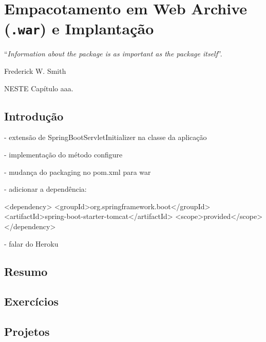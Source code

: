 \chapter{Empacotamento em Web Archive (\texttt{.war}) e Implantação}\label{cap:empacotamento}
\epigraph{``\textit{Information about the package is as important as the package itself}''.}{Frederick W. Smith}

\lettrine[lines=4, lhang=0.1, lraise=0, loversize=0.2, findent=0.1em]{\textcolor{corTema}{N}}{ESTE} Capítulo aaa.

\vfill

\section{Introdução}

- extensão de SpringBootServletInitializer na classe da aplicação

- implementação do método configure

- mudança do packaging no pom.xml para war

- adicionar a dependência:

<dependency>
    <groupId>org.springframework.boot</groupId>
    <artifactId>spring-boot-starter-tomcat</artifactId>
    <scope>provided</scope>
</dependency>

- falar do Heroku

\section{Resumo}

\section{Exercícios}

\section{Projetos}
